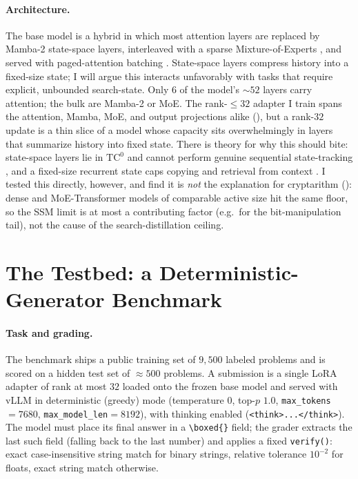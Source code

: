 \documentclass[11pt]{article}
\newcommand{\boxedans}{\texttt{\textbackslash boxed\{\}}}
\begin{document}
\paragraph{Architecture.} The base model is a hybrid in which most attention layers are
replaced by Mamba-2 state-space layers, interleaved with a sparse Mixture-of-Experts
\citep{nemotron3nano2025, dao2024mamba2}, and served with paged-attention batching
\citep{kwon2023vllm}. State-space layers compress history into a fixed-size state; I will
argue this interacts unfavorably with tasks that require explicit, unbounded search-state.
Only $6$ of the model's $\sim\!52$ layers carry attention; the bulk are Mamba-2 or MoE. The
rank-$\leq\!32$ adapter I train spans the attention, Mamba, MoE, and output projections
alike (), but a rank-$32$ update is a thin slice of a model whose capacity
sits overwhelmingly in layers that summarize history into fixed state. There is theory for why
this should bite: state-space layers lie in $\mathrm{TC}^0$ and cannot perform genuine
sequential state-tracking \citep{merrill2024illusion}, and a fixed-size recurrent state caps
copying and retrieval from context \citep{jelassi2024repeat}. I tested this directly, however,
and find it is \emph{not} the explanation for cryptarithm (): dense and
MoE-Transformer models of comparable active size hit the same floor, so the SSM limit is at most
a contributing factor (e.g.\ for the bit-manipulation tail), not the cause of the search-distillation ceiling.

\section{The Testbed: a Deterministic-Generator Benchmark}
\label{sec:testbed}

\paragraph{Task and grading.} The benchmark ships a public training set of $9{,}500$
labeled problems and is scored on a hidden test set of $\approx\!500$ problems. A
submission is a single LoRA adapter of rank at most $32$ loaded onto the frozen base model
and served with vLLM in deterministic (greedy) mode (temperature $0$, top-$p$ $1.0$,
\texttt{max\_tokens}$=7680$, \texttt{max\_model\_len}$=8192$), with thinking enabled
(\verb|<think>...</think>|). The model must place its final answer in a \boxedans{} field;
the grader extracts the last such field (falling back to the last number) and applies a
fixed \texttt{verify()}: exact case-insensitive string match for binary strings,
relative tolerance $10^{-2}$ for floats, exact string match otherwise.
\end{document}

